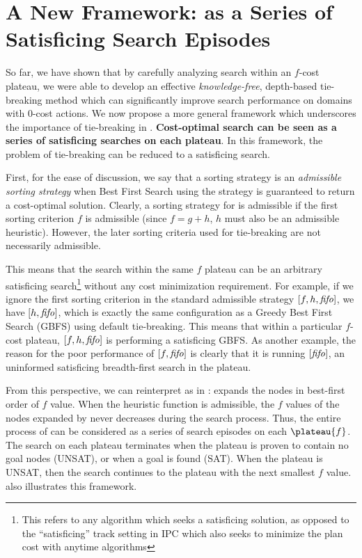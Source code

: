 \clearpage 
\section{A New Framework:  \astar as a Series of Satisficing Search Episodes}
\label{sec:discussion}

So far, we have shown that by carefully analyzing search within an $f$-cost plateau,
we were able to develop an effective
{\it knowledge-free}, depth-based tie-breaking method which can significantly improve search performance on domains with 0-cost actions.
We now propose a more general framework which underscores the importance of tie-breaking in \astar.
\textbf{Cost-optimal search
can be seen as a series of satisficing searches on each plateau}. In this framework, the problem of tie-breaking can be
reduced to a satisficing search.

First, for the ease of discussion, 
we say that a sorting strategy is an \emph{admissible sorting strategy}
when Best First Search using the strategy is guaranteed to return a cost-optimal solution.
Clearly, a sorting strategy for \astar is admissible if %
the first sorting criterion $f$ is admissible (since $f=g+h$, $h$ must also be an admissible heuristic).
However, the later sorting criteria used for tie-breaking are not necessarily admissible.

This means that the search within the same $f$ plateau can be an arbitrary  satisficing search\footnote{This refers to any algorithm which seeks a satisficing solution, as opposed to the ``satisficing'' track setting in IPC which also seeks to minimize the plan cost with anytime algorithms} without any cost minimization requirement. For example,
if we ignore the first sorting criterion in the standard admissible strategy
$[f,h,{\text{\textit{fifo}}}]$, we have $[h,{\text{\textit{fifo}}}]$, which is exactly
the same configuration as a Greedy Best First Search (GBFS) using \fifo default tie-breaking. This 
means that within a particular $f$-cost plateau, $[f,h,{\text{\textit{fifo}}}]$ is
performing a satisficing GBFS.
As another example, the reason for the poor performance of $[f,{\text{\textit{fifo}}}]$
is clearly that it is running $[{\text{\textit{fifo}}}]$,
an uninformed satisficing breadth-first search in the plateau.

From this perspective, we can reinterpret \astar as in : \astar expands the nodes in best-first order of $f$ value. When the
heuristic function is admissible, the $f$ values of the nodes expanded by \astar never decreases during the
search process.
Thus, the entire process of \astar can be considered as a series of search episodes on each $\plateau{f}$.
The search on each plateau terminates when the plateau is proven to contain no goal nodes (UNSAT), or when a goal is found (SAT).
When the plateau is UNSAT, then the search continues to the plateau with the next smallest $f$ value.
 also illustrates this framework.

